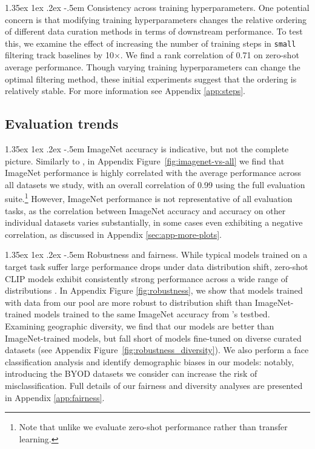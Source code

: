 \documentclass[dvipsnames,11pt]{article}
\makeatletter
\renewcommand\paragraph{\@startsection{paragraph}{4}{\z@}                                     {1.35ex \@plus1ex \@minus.2ex}                                {-.5em}
{\normalfont\normalsize\bfseries}}
\makeatother
\begin{document}
\paragraph{Consistency across training hyperparameters.}
One potential concern is that modifying training hyperparameters changes the relative ordering of different data curation methods in terms of downstream performance.
To test this, we examine the effect of increasing the number of training steps in {\small \texttt{small}} filtering track baselines by 10$\times$.
We find a rank correlation of 0.71 on zero-shot average performance.
Though varying training hyperparameters can change the optimal filtering method, these initial experiments suggest that the ordering is relatively stable. For more information see Appendix \ref{app:steps}.

\subsection{Evaluation trends}
\label{sec:eval-trends}
\paragraph{ImageNet accuracy is indicative, but not the complete picture.} Similarly to \citet{kornblith2019better}, in Appendix Figure~\ref{fig:imagenet-vs-all} we find that ImageNet performance is highly correlated with the average performance across all datasets we study, with an overall correlation of 0.99 using the full evaluation suite.\footnote{Note that unlike \citet{kornblith2019better} we evaluate zero-shot performance rather than transfer learning.} However, ImageNet performance is not representative of all evaluation tasks, as the correlation between ImageNet accuracy and accuracy on other individual datasets varies substantially, in some cases even exhibiting a negative correlation, as discussed in Appendix \ref{sec:app-more-plots}.

\paragraph{Robustness and fairness.} While typical models trained on a target task suffer large performance drops under data distribution shift, zero-shot CLIP models exhibit consistently strong performance across a wide range of distributions \cite{radford2021learning}.
In Appendix Figure \ref{fig:robustness}, we show that models trained with data from our pool are more robust to distribution shift than ImageNet-trained models trained to the same ImageNet accuracy from \citet{taori2020measuring}'s testbed.
Examining geographic diversity, we find that our models are better than ImageNet-trained models, but fall short of models fine-tuned on diverse curated datasets (see Appendix Figure~\ref{fig:robustness_diversity}).
We also perform a face classification analysis and identify demographic biases in our models: notably, introducing the BYOD datasets we consider can increase the risk of misclassification.
Full details of our fairness and diversity analyses are presented in Appendix \ref{app:fairness}. 
\end{document}
